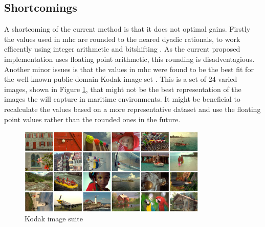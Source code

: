\subsection{Shortcomings}
A shortcoming of the current method is that it does not optimal gains.
Firstly the values used in \gls{mhc} are rounded to the neared dyadic rationals, to work efficently using integer arithmetic and bitshifting \cite{getreuerMalvarHeCutlerLinearImage2011}.
As the current proposed implementation uses floating point arithmetic, this rounding is disadventagious.
Another minor issues is that the values in \gls{mhc} were found to be the best fit for the well-known public-domain Kodak image set \cite{malvarHighqualityGradientcorrectedLinear2009}.
This is a set of 24 varied images, shown in Figure \ref{fig:kodak_image_suite}, that might not be the best representation of the images the \sr will capture in maritime environments.
It might be beneficial to recalculate the values based on a more representative dataset and use the floating point values rather than the rounded ones in the future.


\begin{figure}[H]
    \centering
    \includegraphics[width=0.8\textwidth]{figures/debayer/kodak_test_suite.png}
    \caption{Kodak image suite \cite{franzenTrueColorKodak2013}\cite{chungAdaptiveColorFilter2006}}
    \label{fig:kodak_image_suite}
\end{figure}



